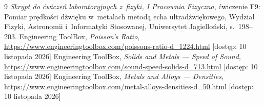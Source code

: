 \documentclass[12pt, a4paper]{article}
\begin{document}
\begin{thebibliography}{9}
    \textit{Skrypt do ćwiczeń laboratoryjnych z~fizyki, I Pracownia Fizyczna}, ćwiczenie F9:
    Pomiar prędkości dźwięku w~metalach metodą echa ultradźwiękowego, Wydział Fizyki,
    Astronomii i~Informatyki Stosowanej, Uniwersytet Jagielloński, s.~198--203.
    Engineering ToolBox, \textit{Poisson's Ratio},
    \url{https://www.engineeringtoolbox.com/poissons-ratio-d_1224.html}
    [dostęp: 10 listopada 2026]
    Engineering ToolBox, \textit{Solids and Metals --- Speed of Sound},
    \url{https://www.engineeringtoolbox.com/sound-speed-solids-d_713.html}
    [dostęp: 10 listopada 2026]
    Engineering ToolBox, \textit{Metals and Alloys --- Densities},
    \url{https://www.engineeringtoolbox.com/metal-alloys-densities-d_50.html}
    [dostęp: 10 listopada 2026]
\end{thebibliography}
\end{document}
